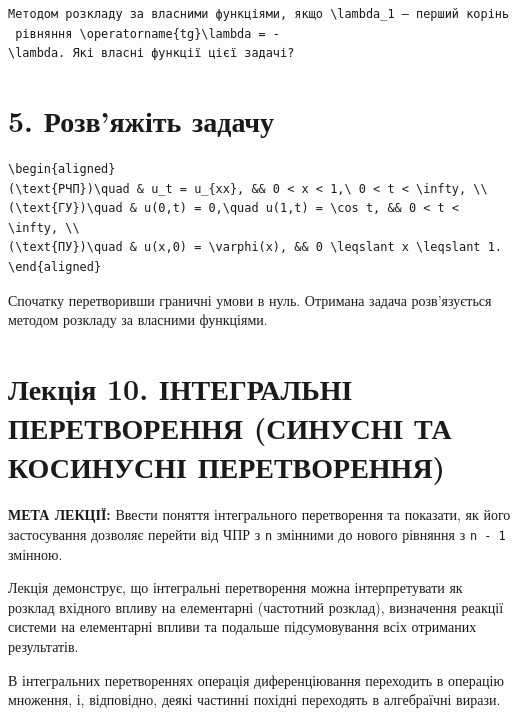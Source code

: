 \documentclass[
  ukrainian,
]{article}
\begin{document}
\texttt{Методом\ розкладу\ за\ власними\ функціями,\ якщо\ \textquotesingle{}\textbackslash{}lambda\_1\textquotesingle{}\ —\ перший\ корінь\ рівняння\ \textquotesingle{}\textbackslash{}operatorname\{tg\}\textbackslash{}lambda\ =\ -\textbackslash{}lambda\textquotesingle{}.\ Які\ власні\ функції\ цієї\ задачі?}

\section{5. Розв'яжіть
задачу}\label{ux440ux43eux437ux432ux44fux436ux456ux442ux44c-ux437ux430ux434ux430ux447ux443-1}

\begin{verbatim}
\begin{aligned}
(\text{РЧП})\quad & u_t = u_{xx}, && 0 < x < 1,\ 0 < t < \infty, \\
(\text{ГУ})\quad & u(0,t) = 0,\quad u(1,t) = \cos t, && 0 < t < \infty, \\
(\text{ПУ})\quad & u(x,0) = \varphi(x), && 0 \leqslant x \leqslant 1.
\end{aligned}
\end{verbatim}

Спочатку перетворивши граничні умови в нуль. Отримана задача
розв'язується методом розкладу за власними функціями.

\section{Лекція 10. ІНТЕГРАЛЬНІ ПЕРЕТВОРЕННЯ (СИНУСНІ ТА КОСИНУСНІ
ПЕРЕТВОРЕННЯ)}\label{ux43bux435ux43aux446ux456ux44f-10.-ux456ux43dux442ux435ux433ux440ux430ux43bux44cux43dux456-ux43fux435ux440ux435ux442ux432ux43eux440ux435ux43dux43dux44f-ux441ux438ux43dux443ux441ux43dux456-ux442ux430-ux43aux43eux441ux438ux43dux443ux441ux43dux456-ux43fux435ux440ux435ux442ux432ux43eux440ux435ux43dux43dux44f}

\textbf{МЕТА ЛЕКЦІЇ:} Ввести поняття інтегрального перетворення та
показати, як його застосування дозволяє перейти від ЧПР з \texttt{n}
змінними до нового рівняння з \texttt{n\ -\ 1} змінною.

Лекція демонструє, що інтегральні перетворення можна інтерпретувати як
розклад вхідного впливу на елементарні (частотний розклад), визначення
реакції системи на елементарні впливи та подальше підсумовування всіх
отриманих результатів.

В інтегральних перетвореннях операція диференціювання переходить в
операцію множення, і, відповідно, деякі частинні похідні переходять в
алгебраїчні вирази.
\end{document}
